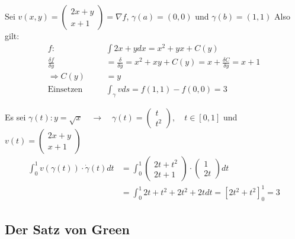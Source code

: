 \documentclass[a4paper]{article}
\begin{document}
		
		\begin{fmerke}
			Sei $v(x,y) = \left( \begin{array}{c} 2x +y \\ x+1 \end{array} \right) = \nabla f$, $\gamma(a) = (0,0)$ und $\gamma(b) = (1,1)$
			Also gilt: 
			\begin{align*}
				f: &\int 2x + y dx = x^2+yx + C(y) \\
				\frac{\delta f}{\delta y} &= \frac{\delta }{\delta y} =x^2+xy +C(y)= x + \frac{\delta C}{\delta y} = x + 1 \\
				\Longrightarrow C(y) &= y\\
			\text{Einsetzen} \qquad & \int_\gamma v ds = f(1,1) -f(0,0) = 3
			\end{align*}
		\end{fmerke}	
		\begin{fmerke}
			Es sei $\gamma(t): y = \sqrt{x} \quad \longrightarrow \quad \gamma (t) = \left( \begin{array} {c} t \\ t^2 \end{array} \right), \quad t \in [0,1]$ und $v(t) = \left( \begin{array}{c} 2x +y \\ x+1 \end{array} \right)$
			\begin{align*}
				\int_0^1 v(\gamma (t)) \cdot \dot{\gamma}(t) dt 
				&= \int_0^1 \left( \begin{array}{c} 2t + t^2 \\ 2t +1 \end{array} \right) \cdot \left( \begin{array}{c} 1 \\ 2t \end{array} \right) dt \\
				&= \int_0^1 2t + t^2 + 2t^2+2t dt = \left[ 2t^2 + t^2 \right]_0^1 = 3
			\end{align*}

			
		\end{fmerke}
	\subsection{Der Satz von Green}
		
\end{document}

